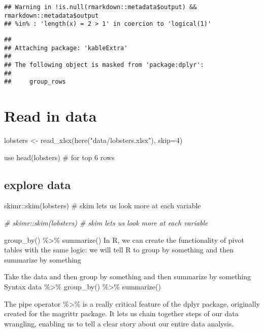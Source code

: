\documentclass[
]{article}
\newenvironment{Shaded}{\begin{snugshade}}{\end{snugshade}}
\newcommand{\AttributeTok}[1]{\textcolor[rgb]{0.77,0.63,0.00}{#1}}
\newcommand{\CommentTok}[1]{\textcolor[rgb]{0.56,0.35,0.01}{\textit{#1}}}
\newcommand{\DecValTok}[1]{\textcolor[rgb]{0.00,0.00,0.81}{#1}}
\newcommand{\FunctionTok}[1]{\textcolor[rgb]{0.00,0.00,0.00}{#1}}
\newcommand{\NormalTok}[1]{#1}
\newcommand{\OtherTok}[1]{\textcolor[rgb]{0.56,0.35,0.01}{#1}}
\newcommand{\StringTok}[1]{\textcolor[rgb]{0.31,0.60,0.02}{#1}}
\begin{document}
\begin{verbatim}
## Warning in !is.null(rmarkdown::metadata$output) && rmarkdown::metadata$output
## %in% : 'length(x) = 2 > 1' in coercion to 'logical(1)'
\end{verbatim}

\begin{verbatim}
## 
## Attaching package: 'kableExtra'
## 
## The following object is masked from 'package:dplyr':
## 
##     group_rows
\end{verbatim}

\hypertarget{read-in-data}{%
\section{Read in data}\label{read-in-data}}

\begin{Shaded}
\begin{Highlighting}[]
\NormalTok{lobsters }\OtherTok{\textless{}{-}} \FunctionTok{read\_xlsx}\NormalTok{(}\FunctionTok{here}\NormalTok{(}\StringTok{"data/lobsters.xlsx"}\NormalTok{), }\AttributeTok{skip=}\DecValTok{4}\NormalTok{)}
\end{Highlighting}
\end{Shaded}

use head(lobsters) \# for top 6 rows

\hypertarget{explore-data}{%
\subsection{explore data}\label{explore-data}}

skimr::skim(lobsters) \# skim lets us look more at each variable

\begin{Shaded}
\begin{Highlighting}[]
\CommentTok{\# skimr::skim(lobsters) \# skim lets us look more at each variable}
\end{Highlighting}
\end{Shaded}

group\_by() \%\textgreater\% summarize() In R, we can create the
functionality of pivot tables with the same logic: we will tell R to
group by something and then summarize by something

Take the data and then group by something and then summarize by
something Syntax data \%\textgreater\% group\_by() \%\textgreater\%
summarize()

The pipe operator \%\textgreater\% is a really critical feature of the
dplyr package, originally created for the magrittr package. It lets us
chain together steps of our data wrangling, enabling us to tell a clear
story about our entire data analysis.
\end{document}
